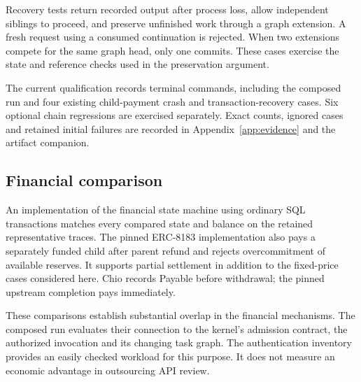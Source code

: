 Recovery tests return recorded output after process loss, allow independent
siblings to proceed, and preserve unfinished work through a graph extension.
A fresh request using a consumed continuation is rejected. When two extensions
compete for the same graph head, only one commits. These cases exercise the
state and reference checks used in the preservation argument.

The current qualification records \NativeCommands{} terminal commands, including the composed
run and four existing child-payment crash and transaction-recovery cases.
Six optional chain regressions are exercised separately. Exact counts,
ignored cases and retained initial failures are recorded in
Appendix~\ref{app:evidence} and the artifact companion.

\subsection{Financial comparison}
An implementation of the financial state machine using ordinary SQL transactions
matches every compared state and balance on the retained representative traces.
The pinned ERC-8183 implementation also pays a separately funded child after
parent refund and rejects overcommitment of available reserves. It supports
partial settlement in addition to the fixed-price cases considered here.
Chio records \textsf{Payable} before withdrawal; the pinned upstream completion
pays immediately.

These comparisons establish substantial overlap in the financial mechanisms.
The composed run evaluates their connection to the kernel's admission contract,
the authorized invocation and its changing task graph. The authentication inventory
provides an easily checked workload for this purpose. It does not measure an
economic advantage in outsourcing API review.
